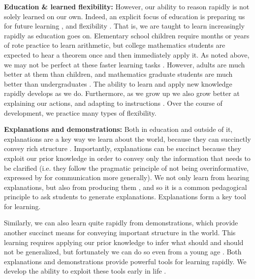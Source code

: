 \textbf{Education \& learned flexibility:} However, our ability to reason rapidly is not solely learned on our own. Indeed, an explicit focus of education is preparing us for future learning \citep{Bransford1999}, and flexibility \citep[e.g.][]{Richland2012}. That is, we are taught to learn increasingly rapidly as education goes on. Elementary school children require months or years of rote practice to learn arithmetic, but college mathematics students are expected to hear a theorem once and then immediately apply it. As noted above, we may not be perfect at these faster learning tasks \citep[e.g.][]{Hazzan1999}. However, adults are much better at them than children, and mathematics graduate students are much better than undergraduates \citep{Weber2001}. The ability to learn and apply new knowledge rapidly develops as we do. Furthermore, as we grow up we also grow better at explaining our actions, and adapting to instructions \citep[e.g.][]{Doebel2015}. Over the course of development, we practice many types of flexibility. \par 
\textbf{Explanations and demonstrations:} Both in education and outside of it, explanations are a key way we learn about the world, because they can succinctly convey rich structure \citep[e.g.][]{Keil2006, Lombrozo2006}. Importantly, explanations can be succinct because they exploit our prior knowledge in order to convey only the information that needs to be clarified (i.e. they follow the pragmatic principle of not being overinformative, expressed by \citet{Grice1975} for communication more generally). We not only learn from hearing explanations, but also from producing them \citep{Chi1989, Chi1994}, and so it is a common pedagogical principle to ask students to generate explanations. Explanations form a key tool for learning. \par
Similarly, we can also learn quite rapidly from demonstrations, which provide another succinct means for conveying important structure in the world. This learning requires applying our prior knowledge to infer what should and should not be generalized, but fortunately we can do so even from a young age \citep[e.g.][]{VanDamme2002}. Both explanations and demonstrations provide powerful tools for learning rapidly. We develop the ability to exploit these tools early in life \citep{Carpenter2005}. \par 
